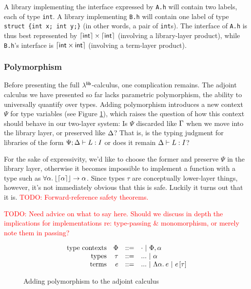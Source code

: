 \documentclass[11pt]{article}
\newcommand{\todo}[1]{\textcolor{red}{\small TODO: #1}}
\begin{document}
A library implementing the interface expressed by \texttt{A.h} will contain two
labels, each of type \texttt{int}. A library implementing \texttt{B.h} will
contain one label of type \texttt{struct \{int x; int y;\}} (in other words, a
pair of \texttt{int}s). The interface of \texttt{A.h} is thus best represented
by $\lceil{\ensuremath{\textsf{int}}}\rceil \times \lceil{\ensuremath{\textsf{int}}}\rceil$ (involving a library-layer product), while
\texttt{B.h}'s interface is $\lceil{\ensuremath{\textsf{int}} \times\ensuremath{\textsf{int}}}\rceil$ (involving a term-layer
product).


\subsubsection{Polymorphism}

Before presenting the full $\lambda^{\textsf{lib}}$-calculus, one complication remains. The
adjoint calculus we have presented so far lacks parametric polymorphism, the
ability to universally quantify over types. Adding polymorphism introduces a new
context $\Psi$ for type variables (see Figure \ref{fig:polymorph}), which raises
the question of how this context should behave in our two-layer system: Is
$\Psi$ discarded like $\Gamma$ when we move into the library layer, or preserved
like $\Delta$? That is, is the typing judgment for libraries of the form $\Psi;\Delta
\vdash L : I$ or does it remain $\Delta \vdash L : I$?

For the sake of expressivity, we'd like to choose the former and preserve $\Psi$
in the library layer, otherwise it becomes impossible to implement a function
with a type such as $\forall \alpha .\: \lfloor{\lceil{\alpha}\rceil}\rfloor \to \alpha$. Since types
$\tau$ are conceptually lower-layer things, however, it's not immediately
obvious that this is safe. Luckily it turns out that it is.
\todo{Forward-reference safety theorems.}

\todo{Need advice on what to say here. Should we discuss in depth the
  implications for implementations re: type-passing \& monomorphism, or merely
  note them in passing?}

%

\begin{figure}
  \centering
  \[\begin{array}{rrcl}
    \text{type contexts} & \Phi &::=& \cdot ~|~ \Phi, \alpha\\
    \text{types} & \tau &::=& ... ~|~ \alpha\\
    \text{terms} & e &::=& ... ~|~ \Lambda \alpha .\: e ~|~ e\hspace{1pt}[\tau]
  \end{array}\]
  \caption{Adding polymorphism to the adjoint calculus}
  \label{fig:polymorph}
\end{figure}
\end{document}
